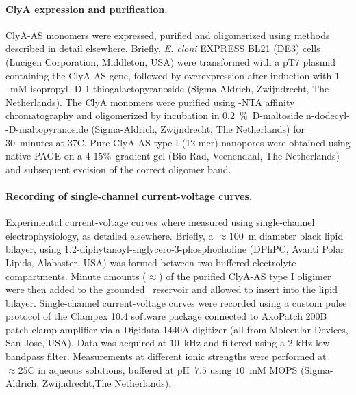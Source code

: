 \documentclass[journal=ancac3,manuscript=article,etalmode=truncate,maxauthors=0,layout=twocolumn]{achemso}
\begin{document}
\paragraph{ClyA expression and purification.}
ClyA-AS monomers were expressed, purified and oligomerized using methods described in detail 
elsewhere.\cite{Soskine-2012,Soskine-2013} Briefly, \textit{E. cloni} EXPRESS BL21 (DE3) cells (Lucigen 
Corporation, Middleton, USA) were transformed with a pT7 plasmid containing the ClyA-AS gene, followed by 
overexpression after induction with $1$~mM isopropyl \textbeta-D-1-thiogalactopyranoside (Sigma-Aldrich, 
Zwijndrecht, The Netherlands). The ClyA monomers were purified using -NTA affinity chromatography and 
oligomerized by incubation in $0.2$~\%\ D-maltoside n-dodecyl-\textbeta-D-maltopyranoside (Sigma-Aldrich, 
Zwijndrecht, The Netherlands) for 30~minutes at 37\textdegree C. Pure ClyA-AS type-I (12-mer) nanopores were 
obtained using native PAGE on a $4$-$15$\%\ gradient gel (Bio-Rad, Veenendaal, The Netherlands) and 
subsequent excision of the correct oligomer band.

\paragraph{Recording of single-channel current-voltage curves.}
Experimental current-voltage curves where measured using single-channel electrophysiology, as detailed 
elsewhere.\cite{Maglia-2010,Soskine-2012,Soskine-2013} Briefly, a $\approx100$~\textmu m diameter 
black lipid bilayer, using 1,2-diphytanoyl-snglycero-3-phosphocholine (DPhPC, Avanti Polar Lipids, Alabaster, 
USA) was formed between two buffered electrolyte compartments. Minute amounts ($\approx$) of the purified 
ClyA-AS type I oligimer were then added to the grounded \cis\ reservoir and allowed to insert into the lipid 
bilayer. Single-channel current-voltage curves were recorded using a custom pulse protocol of the Clampex 
10.4 software package connected to AxoPatch 200B patch-clamp amplifier via a Digidata 1440A digitizer (all 
from Molecular Devices, San Jose, USA). Data was acquired at $10$~kHz and filtered using a $2$-kHz low 
bandpass filter. Measurements at different ionic strengths were performed at $\approx25$\textdegree C in 
aqueous  solutions, buffered at pH~$7.5$ using $10$~mM MOPS (Sigma-Aldrich, Zwijndrecht,The 
Netherlands).

\end{document}
